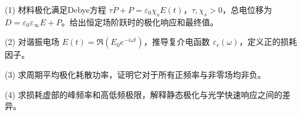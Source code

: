 (1) 材料极化满足Debye方程 \(\tau\dot P+P=\varepsilon_0\chi_sE(t)\)，\(\tau,\chi_s>0\)，总电位移为 \(D=\varepsilon_0\varepsilon_\infty E+P\)。给出恒定场阶跃时的极化响应和最终值。

(2) 对谐振电场 \(E(t)=\Re(E_0e^{-i\omega t})\)，推导复介电函数 \(\varepsilon_r(\omega)\)，定义正的损耗因子。

(3) 求周期平均极化耗散功率，证明它对于所有正频率与非零场均非负。

(4) 求损耗虚部的峰频率和高低频极限，解释静态极化与光学快速响应之间的差异。
